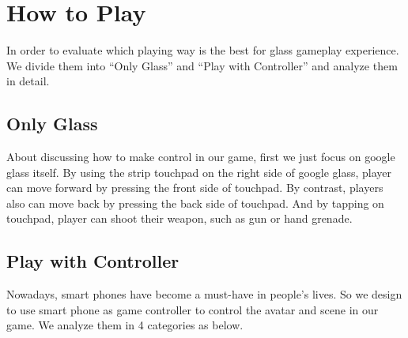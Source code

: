 \documentclass{sigchi}
\begin{document}


\section{How to Play}
In order to evaluate which playing way is the best for glass gameplay experience. We divide them into ``Only Glass'' and ``Play with Controller'' and analyze them in detail.

\subsection{Only Glass}
About discussing how to make control in our game, first we just focus on google glass itself. By using the strip touchpad on the right side of google glass, player can move forward by pressing the front side of touchpad. By contrast, players also can move back by pressing the back side of touchpad. And by tapping on touchpad, player can shoot their weapon, such as gun or hand grenade.

\subsection{Play with Controller}
Nowadays, smart phones have become a must-have in people's lives. So we design to use smart phone as game controller to control the avatar and scene in our game. We analyze them in 4 categories as below.
\end{document}
